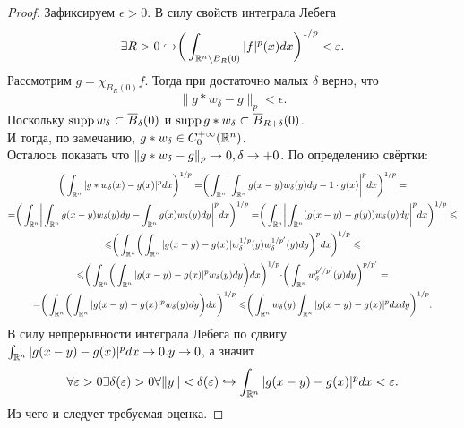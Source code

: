 \begin{proof}
    Зафиксируем $\epsilon > 0$.
    В силу свойств интеграла Лебега
    \[
        \exists R > 0 \hookrightarrow \biggr(\int_{\mathbb{R}^n \setminus B_R(0)}|f|^p(x)dx \biggr)^{1/p} < \varepsilon.
    \]
    Рассмотрим $g = \chi_{B_R(0)}f$.
    Тогда при достаточно малых $\delta$ верно, что
    \[
        \|g * w_\delta - g\|_p < \epsilon.
    \]
    Поскольку $\operatorname{supp} w_\delta \subset \overline{B}_\delta(0)$ и $\operatorname{supp} g * w_\delta \subset \overline{B}_{R + \delta}(0)$. \\
    И тогда, по замечанию, $g * w_\delta \in C^{+\infty}_0(\mathbb{R}^n)$. \\
    Осталось показать что $\|g * w_\delta - g\|_p \rightarrow 0, \delta \rightarrow +0$.
    По определению свёртки:
    \begin{multline*}
        \biggr(\int_{\mathbb{R}^n} |g * w_\delta(x) - g(x)|^pdx \biggr)^{1/p} = \biggr(\int_{\mathbb{R}^n} \biggr|\int_{\mathbb{R}^n} g(x - y)w_{\delta}(y)dy - 1 \cdot g(x)\biggr|^p dx \biggr)^{1/p} =
        \\ = \biggr(\int_{\mathbb{R}^n} \biggr|\int_{\mathbb{R}^n} g(x - y)w_\delta(y)dy - \int_{\mathbb{R}^n}g(x)w_\delta(y)dy \biggr|^p dx \biggr)^{1/p} = \biggr(\int_{\mathbb{R}^n}\biggr|\int_{\mathbb{R}^n} (g(x - y) - g(y))w_{\delta}(y)dy\biggr|^p dx\biggr)^{1/p} \leqslant \\
        \leqslant \biggr( \int_{\mathbb{R}^n} \biggr( \int_{\mathbb{R}^n} |g(x - y) - g(x)|w_{\delta}^{1/p}(y)w_{\delta}^{1/p'}(y)dy \biggr)^p dx  \biggr)^{1/p} \leqslant
        \\ \leqslant \biggr(\int_{\mathbb{R}^n} \biggr(\int_{\mathbb{R}^n} |g(x - y) - g(x)|^p w_\delta(y)dy \biggr)dx \biggr)^{1/p} \cdot \biggr(\int_{\mathbb{R}^n} w_{\delta}^{p'/p'}(y)dy\biggr)^{p/p'} = \\
        = \biggr(\int_{\mathbb{R}^n} \biggr( \int_{\mathbb{R}^n} |g(x - y) - g(x)|^p w_\delta(y)dy \biggr) dx \biggr)^{1/p} \leqslant \biggr(\int_{\mathbb{R}^n}  w_\delta(y) \int_{\mathbb{R}^n}|g(x - y) - g(x)|^p dx dy\biggr)^{1/p}.
    \end{multline*}
    В силу непрерывности интеграла Лебега по сдвигу $\int_{\mathbb{R}^n} |g(x - y) - g(x)|^p dx \rightarrow 0. y \rightarrow 0$, а значит
    \[
        \forall \varepsilon > 0 \exists \delta(\varepsilon) > 0 \forall \|y\| < \delta(\varepsilon) \hookrightarrow \int_{\mathbb{R}^n} |g(x - y) - g(x)|^p dx < \varepsilon.
    \]
    Из чего и следует требуемая оценка.
\end{proof}